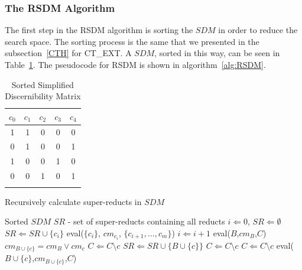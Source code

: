 \documentclass[authoryear,11pt]{elsarticle}
\begin{document}
\subsubsection{The RSDM Algorithm}
%
	The first step in the RSDM algorithm is sorting the $SDM$ in order to reduce the search space. The sorting
	process is the same that we presented in the subsection~\ref{CTH} for CT\_EXT. A $SDM$, sorted in 
	this way, can be seen in Table~\ref{tab:SDM}. The pseudocode for RSDM is shown in algorithm~\ref{alg:RSDM}. 
	
	\begin{table}[!htb]
      \centering
        \caption{Sorted Simplified Discernibility Matrix}
        \begin{tabular}{ccccc}\label{tab:SDM}
            $c_0$ & $c_1$ & $c_2$ & $c_3$ & $c_4$\\
        		\hline
        		1&1&0&0&0\\
        		0&1&0&0&1\\
        		1&0&0&1&0\\
        		0&0&1&0&1\\
        		\\
        \end{tabular} 
	\end{table}	
	
	\renewcommand{\algorithmicrequire}{\textbf{Input:}}
	\renewcommand{\algorithmicensure}{\textbf{Output:}}
	\begin{algorithm}
	\caption{Recursively calculate super-reducts in $SDM$}
	\label{alg:RSDM}
	\begin{algorithmic}[1]
	  \Require Sorted $SDM$
      \Ensure $SR$ - set of super-reducts containing all reducts
	  \State $i \Leftarrow 0$, $SR \Leftarrow \emptyset$
	  \label{line:firstrow}
	  	\label{line:singleT}
	  		\State $SR \Leftarrow SR\cup \lbrace c_i \rbrace$
	  	\Else
	  		\State eval($\lbrace c_i \rbrace$, $cm_{c_i}$, $\lbrace c_{i+1},..., c_m\rbrace$)\label{line:eval}
	  	\EndIf
	  	\State $i \Leftarrow i+1$
	  \EndWhile
	  \State eval($B$,$cm_B$,$C$)
	  	\State $cm_{B\cup \lbrace c\rbrace}=cm_B \vee cm_c$
	  	\label{line:contrib}
	  			\State $C \Leftarrow C\setminus c$\label{line:remT} 
	  			\State $SR \Leftarrow SR\cup\lbrace B\cup \lbrace c\rbrace \rbrace$
	  		\EndIf
	  	\Else
	  		\State $C \Leftarrow C\setminus c$\label{line:remNoContrib} 
	  	\EndIf
	  \EndFor
	  	\State $C \Leftarrow C\setminus c$
	  	\State eval($B\cup \lbrace c\rbrace$,$cm_{B\cup \lbrace c\rbrace}$,$C$)\label{line:recursive} 
	  \EndFor
	\end{algorithmic}
	\end{algorithm}
	
\end{document}
